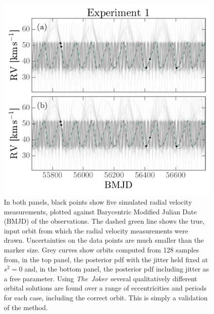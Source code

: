 \documentclass[manuscript, letterpaper]{aastex6}
\newcommand{\project}[1]{\textsl{#1}}
\newcommand{\samplername}{\project{The~Joker}}
\begin{document}
\begin{figure}[p]
\begin{center}
\includegraphics[width=\textwidth]{figures/validation-rv-curves.pdf}
\end{center}
\caption{%
In both panels, black points show five simulated radial velocity measurements, plotted
against Barycentric Modified Julian Date (BMJD) of the observations. The dashed
green line shows the true, input orbit from which the radial velocity measurements
were drawn.
Uncertainties on the data points are much smaller than the marker size.
Grey curves show orbits computed from 128 samples from, in the top panel, the
posterior pdf with the jitter held fixed at $s^2 = 0$ and, in the bottom panel,
the posterior pdf including jitter as a free parameter.
Using \samplername\ several qualitatively different orbital solutions are found over a range of
eccentricities and periods for each case, including the correct orbit.
This is simply a validation of the method.
\label{fig:validation-rv}}
\end{figure}
\end{document}
